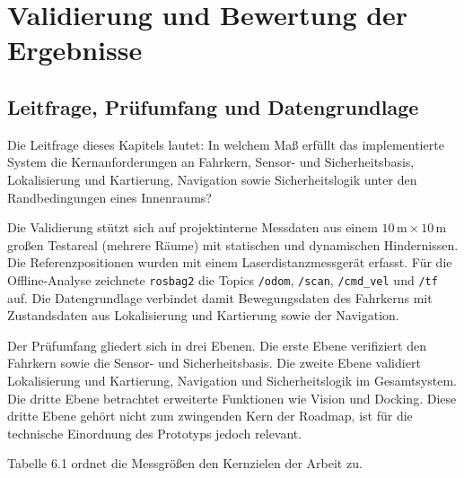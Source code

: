 \chapter{Validierung und Bewertung der Ergebnisse}

\section{Leitfrage, Prüfumfang und Datengrundlage}

Die Leitfrage dieses Kapitels lautet: In welchem Maß erfüllt das implementierte System die Kernanforderungen an Fahrkern, Sensor- und Sicherheitsbasis, Lokalisierung und Kartierung, Navigation sowie Sicherheitslogik unter den Randbedingungen eines Innenraums?

Die Validierung stützt sich auf projektinterne Messdaten aus einem $10\,\mathrm{m} \times 10\,\mathrm{m}$ großen Testareal (mehrere Räume) mit statischen und dynamischen Hindernissen. Die Referenzpositionen wurden mit einem Laserdistanzmessgerät erfasst. Für die Offline-Analyse zeichnete \texttt{rosbag2} die Topics \texttt{/odom}, \texttt{/scan}, \texttt{/cmd\_vel} und \texttt{/tf} auf. Die Datengrundlage verbindet damit Bewegungsdaten des Fahrkerns mit Zustandsdaten aus Lokalisierung und Kartierung sowie der Navigation.

Der Prüfumfang gliedert sich in drei Ebenen. Die erste Ebene verifiziert den Fahrkern sowie die Sensor- und Sicherheitsbasis. Die zweite Ebene validiert Lokalisierung und Kartierung, Navigation und Sicherheitslogik im Gesamtsystem. Die dritte Ebene betrachtet erweiterte Funktionen wie Vision und Docking. Diese dritte Ebene gehört nicht zum zwingenden Kern der Roadmap, ist für die technische Einordnung des Prototyps jedoch relevant.

Tabelle 6.1 ordnet die Messgrößen den Kernzielen der Arbeit zu.


